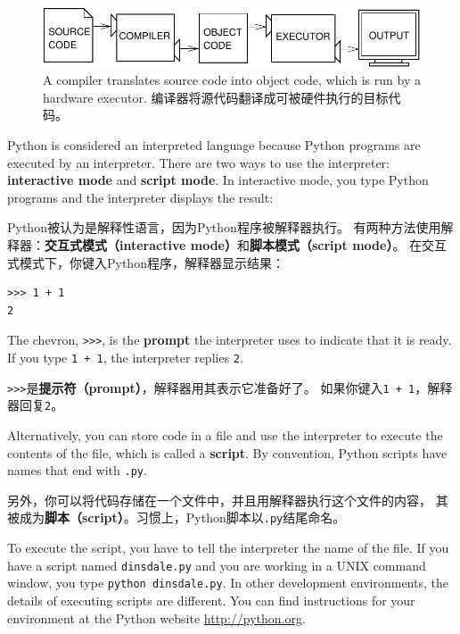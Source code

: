 \documentclass[10pt]{book}
\begin{document}
\begin{CJK}{UTF8}{gbsn}
\begin{figure}
\centerline
{\includegraphics[scale=0.9]{figs/compile.pdf}}
\caption{A compiler translates source code into object code, which is
run by a hardware executor.
编译器将源代码翻译成可被硬件执行的目标代码。}
\label{fig.compile}
\end{figure}

Python is considered an interpreted language because Python programs
are executed by an interpreter.  There are two ways to use the
interpreter: {\bf interactive mode} and {\bf script mode}. In
interactive mode, you type Python programs and the interpreter displays
the result:

Python被认为是解释性语言，因为Python程序被解释器执行。
有两种方法使用解释器：{\bf 交互式模式（interactive mode）}和{\bf 脚本模式（script mode）}。
在交互式模式下，你键入Python程序，解释器显示结果：

\begin{verbatim}
>>> 1 + 1
2
\end{verbatim}
%
The chevron, \verb">>>", is the
{\bf prompt} the interpreter uses to indicate that it is ready.  If
you type {\tt 1 + 1}, the interpreter replies {\tt 2}.

\verb">>>"是{\bf 提示符（prompt）}，解释器用其表示它准备好了。
如果你键入{\tt 1 + 1}，解释器回复{\tt 2}。

Alternatively, you can store code in a file and use the interpreter to
execute the contents of the file, which is called a {\bf script}.  By
convention, Python scripts have names that end with {\tt .py}.

另外，你可以将代码存储在一个文件中，并且用解释器执行这个文件的内容，
其被成为{\bf 脚本（script）}。习惯上，Python脚本以{\tt .py}结尾命名。

To execute the script, you have to tell the interpreter the name of
the file.  If you have a script named {\tt dinsdale.py} and you are
working in a UNIX command window, you type {\tt python
dinsdale.py}.  In other development environments, the details of
executing scripts are different.  You can find instructions for
your environment at the Python website \url{http://python.org}.


\end{CJK}
\end{document}
